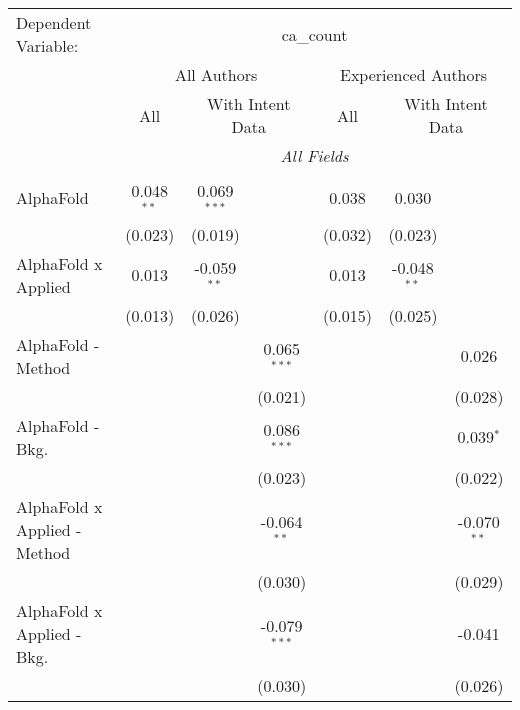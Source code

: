 \begingroup
\centering
\begin{tabular}{lcccccc}
   \tabularnewline \midrule \midrule
   Dependent Variable: & \multicolumn{6}{c}{ca\_count}\\
 & \multicolumn{3}{c}{All Authors} & \multicolumn{3}{c}{Experienced Authors} \\
\cmidrule(lr){2-4} \cmidrule(lr){5-7}
 & \multicolumn{1}{c}{All} & \multicolumn{2}{c}{With Intent Data} & \multicolumn{1}{c}{All} & \multicolumn{2}{c}{With Intent Data} \\
\cmidrule(lr){2-2} \cmidrule(lr){3-4} \cmidrule(lr){5-5} \cmidrule(lr){6-7}
 & \multicolumn{6}{c}{\textit{All Fields}} \\ \\
   AlphaFold                      & 0.048$^{**}$  & 0.069$^{***}$ &                & 0.038   & 0.030         &   \\   
                                  & (0.023)       & (0.019)       &                & (0.032) & (0.023)       &   \\   
   AlphaFold x Applied            & 0.013         & -0.059$^{**}$ &                & 0.013   & -0.048$^{**}$ &   \\   
                                  & (0.013)       & (0.026)       &                & (0.015) & (0.025)       &   \\   
   AlphaFold - Method             &               &               & 0.065$^{***}$  &         &               & 0.026\\   
                                  &               &               & (0.021)        &         &               & (0.028)\\   
   AlphaFold - Bkg.               &               &               & 0.086$^{***}$  &         &               & 0.039$^{*}$\\   
                                  &               &               & (0.023)        &         &               & (0.022)\\   
   AlphaFold x Applied - Method   &               &               & -0.064$^{**}$  &         &               & -0.070$^{**}$\\   
                                  &               &               & (0.030)        &         &               & (0.029)\\   
   AlphaFold x Applied - Bkg.     &               &               & -0.079$^{***}$ &         &               & -0.041\\   
                                  &               &               & (0.030)        &         &               & (0.026)\\   

\end{tabular}
